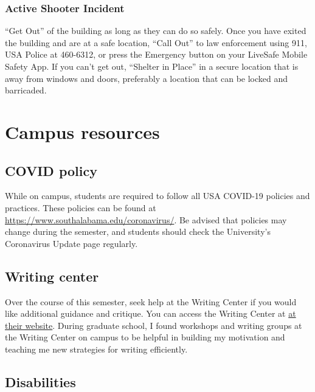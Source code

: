 \documentclass[11pt,]{article}
\begin{document}
\hypertarget{active-shooter-incident}{%
\subsubsection{Active Shooter Incident}\label{active-shooter-incident}}

``Get Out'' of the building as long as they can do so safely. Once you
have exited the building and are at a safe location, ``Call Out'' to law
enforcement using 911, USA Police at 460-6312, or press the Emergency
button on your LiveSafe Mobile Safety App. If you can't get out,
``Shelter in Place'' in a secure location that is away from windows and
doors, preferably a location that can be locked and barricaded.

\hypertarget{campus-resources}{%
\section{Campus resources}\label{campus-resources}}

\hypertarget{covid-policy}{%
\subsection{COVID policy}\label{covid-policy}}

While on campus, students are required to follow all USA COVID-19
policies and practices. These policies can be found at
\url{https://www.southalabama.edu/coronavirus/}. Be advised that
policies may change during the semester, and students should check the
University's Coronavirus Update page regularly.

\hypertarget{writing-center}{%
\subsection{Writing center}\label{writing-center}}

Over the course of this semester, seek help at the Writing Center if you
would like additional guidance and critique. You can access the Writing
Center at
\href{https://www.southalabama.edu/departments/academicsuccess/cae/how.it.works.html}{at
their website}. During graduate school, I found workshops and writing
groups at the Writing Center on campus to be helpful in building my
motivation and teaching me new strategies for writing efficiently.

\hypertarget{disabilities}{%
\subsection{Disabilities}\label{disabilities}}
\end{document}
